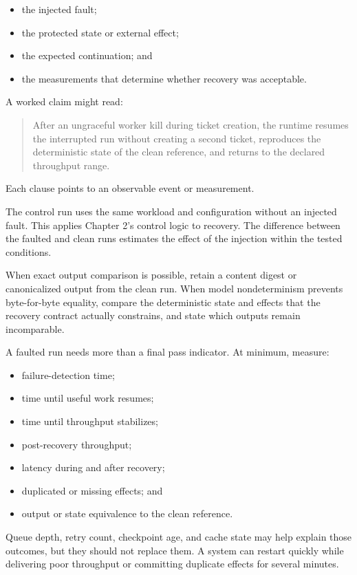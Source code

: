 \begin{itemize}
\tightlist
\item
  the injected fault;
\item
  the protected state or external effect;
\item
  the expected continuation; and
\item
  the measurements that determine whether recovery was acceptable.
\end{itemize}

A worked claim might read:

\begin{quote}
After an ungraceful worker kill during ticket creation, the runtime resumes the interrupted run without creating a second ticket, reproduces the deterministic state of the clean reference, and returns to the declared throughput range.
\end{quote}

Each clause points to an observable event or measurement.

The control run uses the same workload and configuration without an injected fault. This applies Chapter 2's control logic to recovery. The difference between the faulted and clean runs estimates the effect of the injection within the tested conditions.

When exact output comparison is possible, retain a content digest or canonicalized output from the clean run. When model nondeterminism prevents byte-for-byte equality, compare the deterministic state and effects that the recovery contract actually constrains, and state which outputs remain incomparable.

A faulted run needs more than a final pass indicator. At minimum, measure:

\begin{itemize}
\tightlist
\item
  failure-detection time;
\item
  time until useful work resumes;
\item
  time until throughput stabilizes;
\item
  post-recovery throughput;
\item
  latency during and after recovery;
\item
  duplicated or missing effects; and
\item
  output or state equivalence to the clean reference.
\end{itemize}

Queue depth, retry count, checkpoint age, and cache state may help explain those outcomes, but they should not replace them. A system can restart quickly while delivering poor throughput or committing duplicate effects for several minutes.

